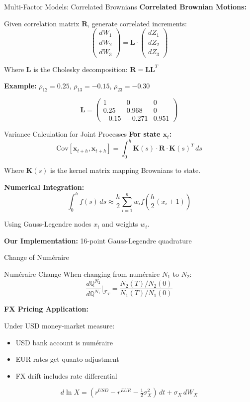 \documentclass[aspectratio=169,11pt]{beamer}
\begin{document}
\begin{frame}{Multi-Factor Models: Correlated Brownians}
\textbf{Correlated Brownian Motions:}

Given correlation matrix $\mathbf{R}$, generate correlated increments:
\[
\begin{pmatrix} dW_1 \\ dW_2 \\ dW_3 \end{pmatrix} = \mathbf{L} \cdot \begin{pmatrix} dZ_1 \\ dZ_2 \\ dZ_3 \end{pmatrix}
\]

Where $\mathbf{L}$ is the Cholesky decomposition: $\mathbf{R} = \mathbf{L}\mathbf{L}^T$

\textbf{Example:} $\rho_{12} = 0.25$, $\rho_{13} = -0.15$, $\rho_{23} = -0.30$

\[
\mathbf{L} = \begin{pmatrix}
1 & 0 & 0 \\
0.25 & 0.968 & 0 \\
-0.15 & -0.271 & 0.951
\end{pmatrix}
\]
\end{frame}

\begin{frame}{Variance Calculation for Joint Processes}
\textbf{For state $\mathbf{x}_t$:}
\[
\text{Cov}[\mathbf{x}_{t+h}, \mathbf{x}_{t+h}] = \int_0^h \mathbf{K}(s) \cdot \mathbf{R} \cdot \mathbf{K}(s)^T\,ds
\]

Where $\mathbf{K}(s)$ is the kernel matrix mapping Brownians to state.

\textbf{Numerical Integration:}
\[
\int_0^h f(s)\,ds \approx \frac{h}{2}\sum_{i=1}^{n} w_i f\left(\frac{h}{2}(x_i + 1)\right)
\]

Using Gauss-Legendre nodes $x_i$ and weights $w_i$.

\textbf{Our Implementation:} 16-point Gauss-Legendre quadrature
\end{frame}

\begin{frame}{Change of Numéraire}
\begin{block}{Numéraire Change}
When changing from numéraire $N_1$ to $N_2$:
\[
\frac{d\mathbb{Q}^{N_2}}{d\mathbb{Q}^{N_1}}\bigg|_{\mathcal{F}_T} = \frac{N_2(T) / N_2(0)}{N_1(T) / N_1(0)}
\]
\end{block}

\textbf{FX Pricing Application:}

Under USD money-market measure:
\begin{itemize}
    \item USD bank account is numéraire
    \item EUR rates get quanto adjustment
    \item FX drift includes rate differential
\end{itemize}

\[
d\ln X = (r^{USD} - r^{EUR} - \tfrac{1}{2}\sigma_X^2)\,dt + \sigma_X\,dW_X
\]
\end{frame}
\end{document}
